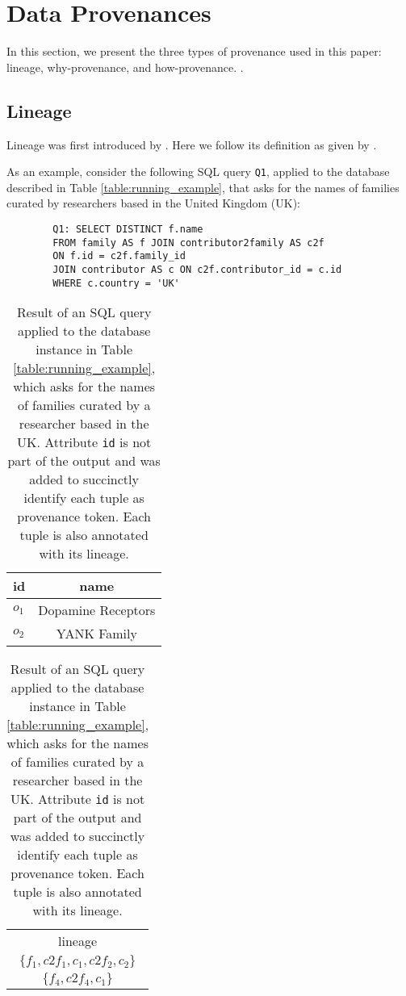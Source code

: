 \section{Data Provenances}
\label{section:preliminaries}
In this section, we present the three types of provenance used in this paper:  lineage, why-provenance, and how-provenance. 
. 

\subsection{Lineage}
Lineage was first introduced by \citet{lineageCui}. Here we follow its definition as given by \citet{CheneyProvSurvey}.

As an example, consider the following SQL query \texttt{Q1}, applied to the database described in Table \ref{table:running_example}, that asks for the names of families curated by researchers based in the United Kingdom (UK):

\vspace{2mm}
{\footnotesize
\begin{adjustwidth}{25pt}{0pt}
\begin{verbatim}
		Q1: SELECT DISTINCT f.name
		FROM family AS f JOIN contributor2family AS c2f 
		ON f.id = c2f.family_id
		JOIN contributor AS c ON c2f.contributor_id = c.id
		WHERE c.country = 'UK'
\end{verbatim}	
\end{adjustwidth}
}
\vspace{2mm}

\begin{table}[hbt]
\centering
  \begin{tabular}{|l||c|}
  \hline
    id & name\\
    \hline
    $o_1$ &  Dopamine Receptors\\
    $o_2$ & YANK Family\\
    \hline
  \end{tabular}
  \begin{tabular}{c}
  	lineage   \\
  	$\{f_1, c2f_1, c_1, c2f_2, c_2\}$ \\
  	$\{ f_4, c2f_4, c_1\}$ \\
  \end{tabular}
    \caption{Result of an SQL query applied to the database instance in Table \ref{table:running_example}, which asks for the names of families curated by a researcher based in the UK. Attribute \texttt{id} is not part of the output and was added to succinctly identify each tuple as provenance token. Each tuple is also annotated with its lineage.}
  \label{table:result}
\end{table}

